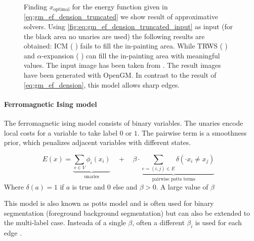 \begin{figure}[H]
{    }
    \caption[Energy based truncated denoising]{
        Finding $x_{\text{optimal}} $ for the energy function given
        in \cref{eq:gm_ef_dension_truncated} we show result of approximative solvers.
        Using \cref{fig:eq:gm_ef_dension_truncated_input} as input (for the black area no unaries 
        are used)
        the following
        results are obtained: ICM \citep{besag_1986_icm}  ( ) fails
        to fill the in-painting area. While TRWS \cite{kolmogorov_2006_pami_trws}  ( ) 
        and $\alpha$-expansion \cite{boykov_2001_pami}  ( ) can fill the in-painting area
        with meaningful values.
        The input image has been taken from \citep{szeliski_2008_pami}.
        The result images have been generated with OpenGM.
        In contrast to the result of \cref{eq:gm_ef_dension}, this model
        allows sharp edges.
    }\label{fig:gm_ef_dension_truncated}
\end{figure}


\paragraph{Ferromagnetic Ising model}
The ferromagnetic ising model consists 
of binary variables.
The unaries encode local costs for a variable
to take label $0$ or $1$.
The pairwise term is a smoothness prior, which penalizes
adjacent variables with different states.

\begin{equation} \label{eq:gm_ising}
    E(x) = 
    \underbrace{
        \sum_{v \in V} \phi_i(x_i)
    }_{\text{unaries}}
     \quad +  \quad
    \underbrace{
        \beta \cdot \sum_{e=(i,j) \in E }  \delta(\cdot x_i\neq x_j) 
    }_{\text{pairwise potts terms}}
\end{equation}
Where $\delta(a)=1$ if $a$ is true and $0$ else
and $\beta>0$.
A large value of $\beta$

This model is also known as potts model and is often
used for binary segmentation (\eg foreground background segmentation)
but can also be extended to the multi-label case.
Insteada of a single $\beta$, often a different $\beta_i$ is used
for each edge \citep{szeliski_2008_pami}.



